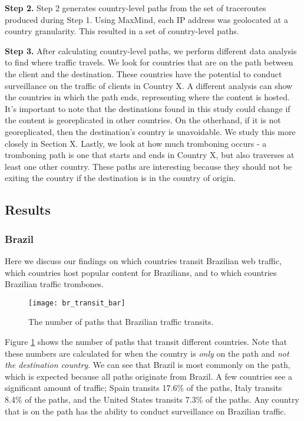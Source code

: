 {\bf Step 2.}  Step 2 generates country-level paths from the set of traceroutes produced during Step 1.  Using MaxMind, each IP address was geolocated at a country granularity.  This resulted in a set of country-level paths.

{\bf Step 3.}  After calculating country-level paths, we perform different data analysis to find where traffic travels.  We look for countries that are on the path between the client and the destination.  These countries have the potential to conduct surveillance on the traffic of clients in Country X.  A different analysis can show the countries in which the path ends, representing where the content is hosted.  It's important to note that the destinations found in this study could change if the content is georeplicated in other countries.  On the otherhand, if it is not georeplicated, then the destination's country is unavoidable.  We study this more closely in Section X.  Lastly, we look at how much tromboning occurs - a tromboning path is one that starts and ends in Country X, but also traverses at least one other country.  These paths are interesting because they should not be exiting the country if the destination is in the country of origin.  

\subsection{Results}

\subsubsection{Brazil}
Here we discuss our findings on which countries transit Brazilian web traffic, which countries host popular content for Brazilians, and to which countries Brazilian traffic trombones.  

\begin{figure}
\centering
\texttt{[image: br\_transit\_bar]}
\caption{The number of paths that Brazilian traffic transits.}
\label{fig:transit_br}
\end{figure}

Figure \ref{fig:transit_br} shows the number of paths that transit different countries.  Note that these numbers are calculated for when the country is \textit{only} on the path and \textit{not the destination country}.  We can see that Brazil is most commonly on the path, which is expected because all paths originate from Brazil.  A few countries see a significant amount of traffic; Spain transits 17.6\% of the paths, Italy transits 8.4\% of the paths, and the United States transits 7.3\% of the paths.  Any country that is on the path has the ability to conduct surveillance on Brazilian traffic.  

